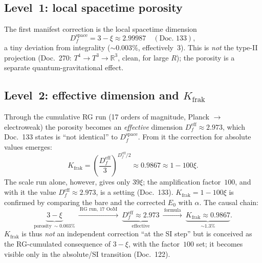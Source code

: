 \subsection{Level~1: local spacetime porosity}
The first manifest correction is the local spacetime dimension
\[
D_f^{\text{space}}=3-\xi\approx 2.99987\quad(\text{Doc.~133}),
\]
a tiny deviation from integrality ($\sim0.003\%$, effectively~$3$). This is \emph{not} the type-II
projection (Doc.~270: $T^4\to T^3\to\mathbb{R}^3$, clean, for large $R$); the porosity is a separate
quantum-gravitational effect.

\subsection{Level~2: effective dimension and $K_{\text{frak}}$}
Through the cumulative RG run (17 orders of magnitude, Planck $\to$ electroweak) the porosity becomes
an \emph{effective} dimension $D_f^{\text{eff}}\approx2.973$, which Doc.~133 states is \enquote{not
identical} to $D_f^{\text{space}}$. From it the correction for absolute values emerges:
\[
K_{\text{frak}}=\left(\frac{D_f^{\text{eff}}}{3}\right)^{\!D_f^{\text{eff}}/2}\approx 0.9867
\approx 1-100\xi .
\]
The scale run alone, however, gives only $39\xi$; the amplification factor~$100$, and with it the value
$D_f^{\text{eff}}\approx2.973$, is a setting (Doc.~133). $K_{\text{frak}}=1-100\xi$ is confirmed by
comparing the bare and the corrected $E_0$ with $\alpha$. The causal chain:
\[
\underbrace{3-\xi}_{\text{porosity}\ \sim0.003\%}\ \xrightarrow{\ \text{RG run, 17 OoM}\ }\
\underbrace{D_f^{\text{eff}}\approx2.973}_{\text{effective}}\ \xrightarrow{\ \text{formula}\ }\
\underbrace{K_{\text{frak}}\approx0.9867}_{\sim1.3\%}.
\]
$K_{\text{frak}}$ is thus \emph{not} an independent correction \enquote{at the SI step} but is conceived
as the RG-cumulated consequence of $3-\xi$, with the factor~$100$ set; it becomes visible only in the absolute/SI transition
(Doc.~122).

